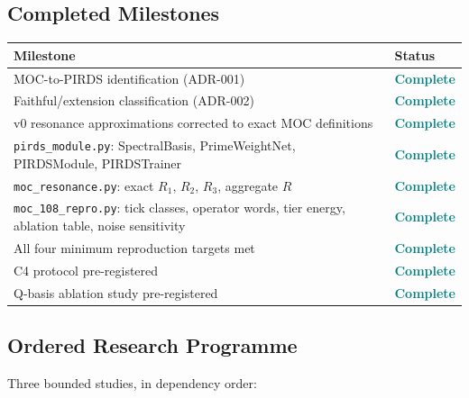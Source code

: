 \documentclass[11pt,a4paper]{article}
\theoremstyle{plain}
\theoremstyle{definition}
\theoremstyle{remark}
\begin{document}
\subsection{Completed Milestones}

\begin{center}
\begin{tabular}{p{}p{}}
  \toprule
  Milestone & Status \\
  \midrule
  MOC-to-PIRDS identification (ADR-001) & \textcolor{teal}{\textbf{Complete}} \\
  Faithful/extension classification (ADR-002) & \textcolor{teal}{\textbf{Complete}} \\
  v0 resonance approximations corrected to exact MOC definitions & \textcolor{teal}{\textbf{Complete}} \\
  \texttt{pirds\_module.py}: SpectralBasis, PrimeWeightNet, PIRDSModule, PIRDSTrainer & \textcolor{teal}{\textbf{Complete}} \\
  \texttt{moc\_resonance.py}: exact $R_1$, $R_2$, $R_3$, aggregate $R$ & \textcolor{teal}{\textbf{Complete}} \\
  \texttt{moc\_108\_repro.py}: tick classes, operator words, tier energy, ablation table, noise sensitivity & \textcolor{teal}{\textbf{Complete}} \\
  All four minimum reproduction targets met & \textcolor{teal}{\textbf{Complete}} \\
  C4 protocol pre-registered & \textcolor{teal}{\textbf{Complete}} \\
  Q-basis ablation study pre-registered & \textcolor{teal}{\textbf{Complete}} \\
  \bottomrule
\end{tabular}
\end{center}

\subsection{Ordered Research Programme}

Three bounded studies, in dependency order:
\end{document}
